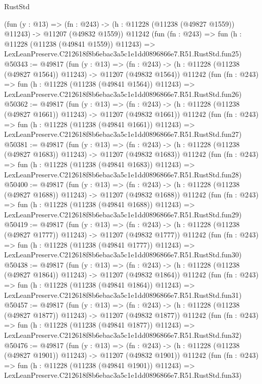 \begin{lexlean}{RustStd}
\begin{coremodule}
    (fun (y : @13) =>
    (fn : @243) -> (h : @11228 (@11238 (@49827 @1559)) @11243) -> @11207 (@49832 @1559))
    @11242
    (fun (fn : @243) =>
    fun (h : @11228 (@11238 (@49841 @1559)) @11243) =>
    LexLeanPreserve.C212618f8b6ebac3a5c1e1dd0896866e7.R51.RustStd.fun25)
@50343 := @49817
    (fun (y : @13) =>
    (fn : @243) -> (h : @11228 (@11238 (@49827 @1564)) @11243) -> @11207 (@49832 @1564))
    @11242
    (fun (fn : @243) =>
    fun (h : @11228 (@11238 (@49841 @1564)) @11243) =>
    LexLeanPreserve.C212618f8b6ebac3a5c1e1dd0896866e7.R51.RustStd.fun26)
@50362 := @49817
    (fun (y : @13) =>
    (fn : @243) -> (h : @11228 (@11238 (@49827 @1661)) @11243) -> @11207 (@49832 @1661))
    @11242
    (fun (fn : @243) =>
    fun (h : @11228 (@11238 (@49841 @1661)) @11243) =>
    LexLeanPreserve.C212618f8b6ebac3a5c1e1dd0896866e7.R51.RustStd.fun27)
@50381 := @49817
    (fun (y : @13) =>
    (fn : @243) -> (h : @11228 (@11238 (@49827 @1683)) @11243) -> @11207 (@49832 @1683))
    @11242
    (fun (fn : @243) =>
    fun (h : @11228 (@11238 (@49841 @1683)) @11243) =>
    LexLeanPreserve.C212618f8b6ebac3a5c1e1dd0896866e7.R51.RustStd.fun28)
@50400 := @49817
    (fun (y : @13) =>
    (fn : @243) -> (h : @11228 (@11238 (@49827 @1688)) @11243) -> @11207 (@49832 @1688))
    @11242
    (fun (fn : @243) =>
    fun (h : @11228 (@11238 (@49841 @1688)) @11243) =>
    LexLeanPreserve.C212618f8b6ebac3a5c1e1dd0896866e7.R51.RustStd.fun29)
@50419 := @49817
    (fun (y : @13) =>
    (fn : @243) -> (h : @11228 (@11238 (@49827 @1777)) @11243) -> @11207 (@49832 @1777))
    @11242
    (fun (fn : @243) =>
    fun (h : @11228 (@11238 (@49841 @1777)) @11243) =>
    LexLeanPreserve.C212618f8b6ebac3a5c1e1dd0896866e7.R51.RustStd.fun30)
@50438 := @49817
    (fun (y : @13) =>
    (fn : @243) -> (h : @11228 (@11238 (@49827 @1864)) @11243) -> @11207 (@49832 @1864))
    @11242
    (fun (fn : @243) =>
    fun (h : @11228 (@11238 (@49841 @1864)) @11243) =>
    LexLeanPreserve.C212618f8b6ebac3a5c1e1dd0896866e7.R51.RustStd.fun31)
@50457 := @49817
    (fun (y : @13) =>
    (fn : @243) -> (h : @11228 (@11238 (@49827 @1877)) @11243) -> @11207 (@49832 @1877))
    @11242
    (fun (fn : @243) =>
    fun (h : @11228 (@11238 (@49841 @1877)) @11243) =>
    LexLeanPreserve.C212618f8b6ebac3a5c1e1dd0896866e7.R51.RustStd.fun32)
@50476 := @49817
    (fun (y : @13) =>
    (fn : @243) -> (h : @11228 (@11238 (@49827 @1901)) @11243) -> @11207 (@49832 @1901))
    @11242
    (fun (fn : @243) =>
    fun (h : @11228 (@11238 (@49841 @1901)) @11243) =>
    LexLeanPreserve.C212618f8b6ebac3a5c1e1dd0896866e7.R51.RustStd.fun33)

\end{coremodule}
\end{lexlean}
